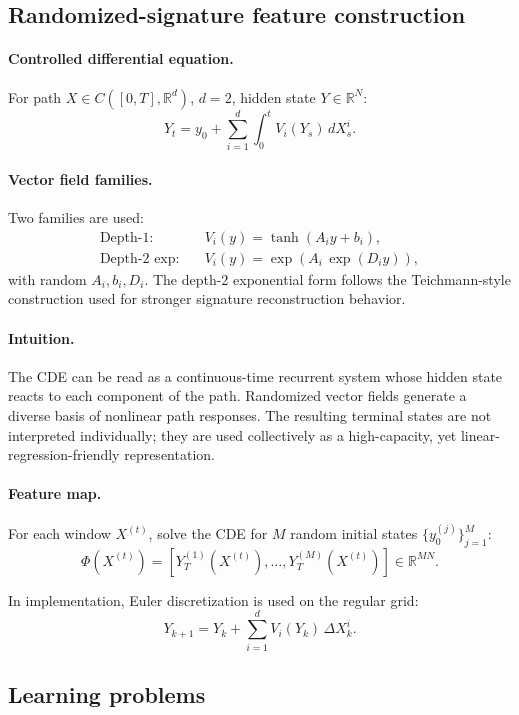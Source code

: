 \documentclass[11pt]{article}
\begin{document}
\subsection{Randomized-signature feature construction}
\paragraph{Controlled differential equation.}
For path \(X\in C([0,T],\mathbb{R}^d)\), \(d=2\), hidden state \(Y\in\mathbb{R}^N\):
\[
Y_t = y_0 + \sum_{i=1}^{d} \int_0^t V_i(Y_s)\, dX_s^i.
\]

\paragraph{Vector field families.}
Two families are used:
\begin{align*}
\text{Depth-1:}\quad &V_i(y) = \tanh(A_i y + b_i),\\
\text{Depth-2 exp:}\quad &V_i(y) = \exp\!\left(A_i\,\exp(D_i y)\right),
\end{align*}
with random \(A_i, b_i, D_i\).
The depth-2 exponential form follows the Teichmann-style construction used for stronger signature reconstruction behavior.
\paragraph{Intuition.}
The CDE can be read as a continuous-time recurrent system whose hidden state reacts to each component of the path. Randomized vector fields generate a diverse basis of nonlinear path responses. The resulting terminal states are not interpreted individually; they are used collectively as a high-capacity, yet linear-regression-friendly representation.

\paragraph{Feature map.}
For each window \(X^{(t)}\), solve the CDE for \(M\) random initial states \(\{y_0^{(j)}\}_{j=1}^M\):
\[
\Phi(X^{(t)}) =
\left[
Y_T^{(1)}(X^{(t)}),\dots,Y_T^{(M)}(X^{(t)})
\right]\in \mathbb{R}^{MN}.
\]

In implementation, Euler discretization is used on the regular grid:
\[
Y_{k+1} = Y_k + \sum_{i=1}^{d} V_i(Y_k)\,\Delta X_k^i.
\]

\subsection{Learning problems}
\end{document}
